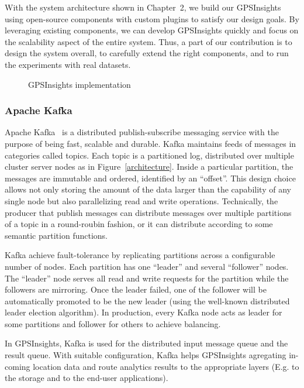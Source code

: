 \documentclass{acm_proc_article-sp}
\begin{document}
With the system architecture shown in Chapter~2, we build our GPSInsights using open-source components with custom plugins to satisfy our design goals. By leveraging existing components, we can develop GPSInsights quickly and focus on the scalability aspect of the entire system. Thus, a part of our contribution is to design the system overall, to carefully extend the right components, and to run the experiments with real datasets.  

\begin{figure}[h]
\centering
{}
\caption{GPSInsights implementation}
\end{figure}

\subsubsection{Apache Kafka} 

Apache Kafka~\cite{kafkapaper,kafkaweb} is a distributed publish-subscribe messaging service with the purpose of being fast, scalable and durable. Kafka maintains feeds of messages in categories called topics. Each topic is a partitioned log, distributed over multiple cluster server nodes as in Figure~\ref{architecture}. Inside a particular partition, the messages are immutable and ordered, identified by an ``offset''. This design choice allows not only storing the amount of the data larger than the capability of any single node but also parallelizing read and write operations. Technically, the producer that publish messages can distribute messages over multiple partitions of a topic in a round-roubin fashion, or it can distribute according to some semantic partition functions.

Kafka achieve fault-tolerance by replicating partitions across a configurable number of nodes. Each partition has one ``leader'' and several ``follower'' nodes. The ``leader'' node serves all read and write requests for the partition while the followers are mirroring. Once the leader failed, one of the follower will be automatically promoted to be the new leader (using the well-known distributed leader election algorithm). In production, every Kafka node acts as leader for some partitions and follower for others to achieve balancing. 

In GPSInsights, Kafka is used for the distributed input message queue and the result queue. With suitable configuration, Kafka helps GPSInsights agregating in-coming location data and route analytics results to the appropriate layers (E.g. to the storage and to the end-user applications).
\end{document}
